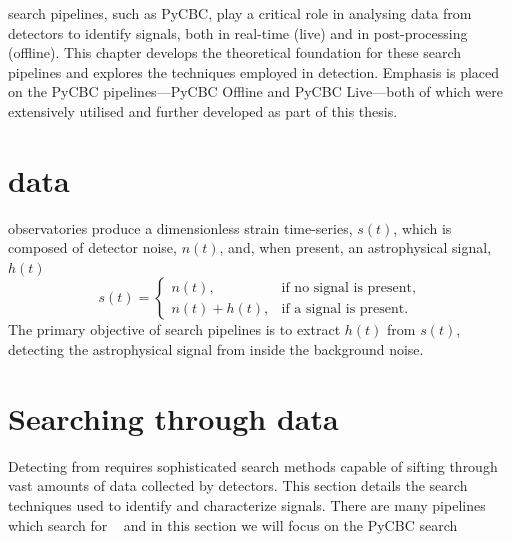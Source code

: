 



\Gwadj search pipelines, such as PyCBC, play a critical role in analysing data from detectors to identify \gwadj signals, both in real-time (live) and in post-processing (offline). This chapter develops the theoretical foundation for these search pipelines and explores the techniques employed in \gwadj detection. Emphasis is placed on the PyCBC pipelines---PyCBC Offline and PyCBC Live---both of which were extensively utilised and further developed as part of this thesis.

\section{\label{2:sec:gw-data}\Gwadj data}

\Gwadj observatories produce a dimensionless strain time-series, $s(t)$, which is composed of detector noise, $n(t)$, and, when present, an astrophysical \gwadj signal, $h(t)$
%
\begin{equation}
    s(t) =
    \begin{cases}
        n(t), & \text{if no signal is present}, \\
        n(t) + h(t), & \text{if a signal is present}.
    \end{cases}
\end{equation}
%
The primary objective of \gwadj search pipelines is to extract $h(t)$ from $s(t)$, detecting the astrophysical signal from inside the background noise.

\section{\label{2:sec:search-methods}Searching through \gwadj data}

Detecting \gws from \cbcs requires sophisticated search methods capable of sifting through vast amounts of data collected by \gwadj detectors. This section details the search techniques used to identify and characterize \gwadj signals. There are many pipelines which search for \gws~\cite{pipelines, PyCBC:2017, GstLAL:2020, SPIIR:2020, MBTA:2021, cWB:2020, oLIB:2015, MLy:2020qax} and in this section we will focus on the PyCBC search~\cite{PyCBC:2016, PyCBC:2017, PyCBC_package:2021}

